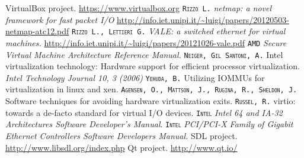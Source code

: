 \documentclass[a4paper, 12pt, titlepage]{report}
\newcommand{\autori}[1]{\textsc{\texttt{#1}}}
\begin{document}
\begin{thebibliography}{30}
 VirtualBox project. \url{https://www.virtualbox.org}
 \autori{Rizzo L.} \textit{netmap: a novel framework for fast packet I/O} \url{http://info.iet.unipi.it/~luigi/papers/20120503-netmap-atc12.pdf}
 \autori{Rizzo L., Lettieri G.} \textit{VALE: a switched ethernet for virtual machines.} \url{http://info.iet.unipi.it/~luigi/papers/20121026-vale.pdf}
 \autori{AMD} \textit{Secure Virtual Machine Architecture Reference Manual.}
 \autori{Neiger, Gil Santoni, A.} Intel virtualization technology: Hardware support for efficient processor virtualization. \textit{Intel Technology Journal 10, 3 (2006)}
 \autori{Yehuda, B.} Utilizing IOMMUs for virtualization in linux and xen.
 \autori{Agensen, O., Mattson, J., Rugina, R., Sheldon, J.} Software techniques for avoiding hardware virtualization exits.
 \autori{Russel, R.} virtio: towards a de-facto standard for virtual I/O devices.
 \autori{Intel} \textit{Intel 64 and IA-32 Architectures Software Developer's Manual}.
 \autori{Intel} \textit{PCI/PCI-X Family of Gigabit Ethernet Controllers Software Developers Manual.}
 SDL project. \url{http://www.libsdl.org/index.php}
 Qt project. \url{http://www.qt.io/}
\end{thebibliography}
	
\end{document}
